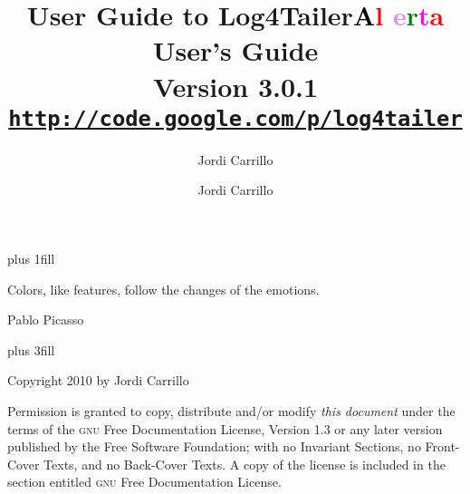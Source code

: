 \documentclass[a4paper, twoside]{article}
\author{Jordi Carrillo}
\title{User Guide to Log4Tailer}
\newcommand{\logftailer}{\textbf{\textcolor{black}{L}\textcolor{red}{o}%
\textcolor{Violet}{g}4\textcolor{green}{T}\textcolor{magenta}{ail}\textcolor{red}{er}}}
\newcommand{\alerta}{\textbf{\textcolor{black}{A}\textcolor{red}{l}%
\textcolor{Violet}{e}\textcolor{green}{r}\textcolor{magenta}{t}\textcolor{red}{a}}}
\newcommand{\contentsrule}[1]{{\color{blue}\sectionrule{3ex}{3pt}{-2ex}{1pt}{#1}}}
\begin{document}


\newpage
\pagecolor{white}

\vbox{}
\vskip0pt plus 1fill
\epigraph{Colors, like features, follow the changes of the emotions.}{Pablo Picasso}
 \vskip0pt plus 3fill

\noindent
Copyright 2010 by Jordi Carrillo

\medskip
\noindent 
Permission is granted to copy, distribute and/or modify \emph{this document}
under the terms of the \textsc{gnu} Free Documentation License, Version 1.3
or any later version published by the Free Software Foundation;
with no Invariant Sections, no Front-Cover Texts, and no Back-Cover Texts.
A copy of the license is included in the section entitled \textsc{gnu}
Free Documentation License.


\vbox{}
\newpage


\title{{\bfseries \alerta{} User's Guide}\\[1mm]
  \large Version 3.0.1\\[1mm]
\large\href{http://code.google.com/p/log4tailer}{\texttt{http://code.google.com/p/log4tailer}}}
\author{Jordi Carrillo}

\maketitle

\tableofcontents

\newpage




%

\end{document}
